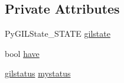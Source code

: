 \subsection*{\-Private \-Attributes}
\begin{DoxyCompactItemize}
\item 
\-Py\-G\-I\-L\-State\-\_\-\-S\-T\-A\-T\-E \hyperlink{classecto_1_1py_1_1scoped__call__back__to__python_a67de9bb9e263a7e77cefe47e75b18512}{gilstate}
\item 
bool \hyperlink{classecto_1_1py_1_1scoped__call__back__to__python_a4f4d2f01e986f7b93028996a7bd8498f}{have}
\item 
\hyperlink{structecto_1_1py_1_1gilstatus}{gilstatus} \hyperlink{classecto_1_1py_1_1scoped__call__back__to__python_a421a7edb2c8c08321c015312217caad7}{mystatus}
\end{DoxyCompactItemize}


